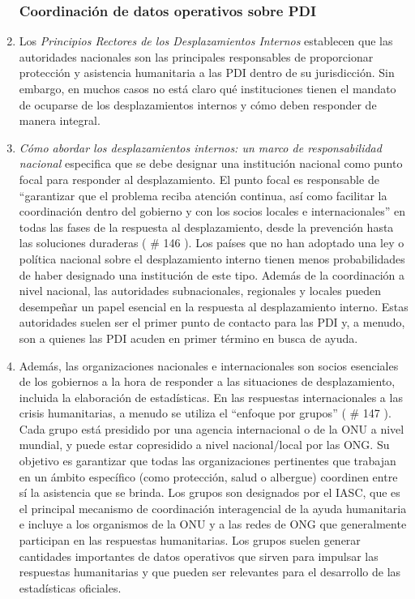 \documentclass[
]{book}
\begin{document}
\begin{enumerate}
{  \subsubsection{Coordinación de datos operativos sobre PDI}\label{coordinaciuxf3n-de-datos-operativos-sobre-pdi}}
\item
  Los \emph{Principios Rectores de los Desplazamientos Internos} establecen que las autoridades nacionales son las principales responsables de proporcionar protección y asistencia humanitaria a las PDI dentro de su jurisdicción. Sin embargo, en muchos casos no está claro qué instituciones tienen el mandato de ocuparse de los desplazamientos internos y cómo deben responder de manera integral.
\item
  \emph{Cómo abordar los desplazamientos internos: un marco de responsabilidad nacional} especifica que se debe designar una institución nacional como punto focal para responder al desplazamiento. El punto focal es responsable de ``garantizar que el problema reciba atención continua, así como facilitar la coordinación dentro del gobierno y con los socios locales e internacionales'' en todas las fases de la respuesta al desplazamiento, desde la prevención hasta las soluciones duraderas (
  \# 146
  ). Los países que no han adoptado una ley o política nacional sobre el desplazamiento interno tienen menos probabilidades de haber designado una institución de este tipo. Además de la coordinación a nivel nacional, las autoridades subnacionales, regionales y locales pueden desempeñar un papel esencial en la respuesta al desplazamiento interno. Estas autoridades suelen ser el primer punto de contacto para las PDI y, a menudo, son a quienes las PDI acuden en primer término en busca de ayuda.
\item
  Además, las organizaciones nacionales e internacionales son socios esenciales de los gobiernos a la hora de responder a las situaciones de desplazamiento, incluida la elaboración de estadísticas. En las respuestas internacionales a las crisis humanitarias, a menudo se utiliza el ``enfoque por grupos'' (
  \# 147
  ). Cada grupo está presidido por una agencia internacional o de la ONU a nivel mundial, y puede estar copresidido a nivel nacional/local por las ONG. Su objetivo es garantizar que todas las organizaciones pertinentes que trabajan en un ámbito específico (como protección, salud o albergue) coordinen entre sí la asistencia que se brinda. Los grupos son designados por el IASC, que es el principal mecanismo de coordinación interagencial de la ayuda humanitaria e incluye a los organismos de la ONU y a las redes de ONG que generalmente participan en las respuestas humanitarias. Los grupos suelen generar cantidades importantes de datos operativos que sirven para impulsar las respuestas humanitarias y que pueden ser relevantes para el desarrollo de las estadísticas oficiales.

\end{enumerate}
\end{document}
